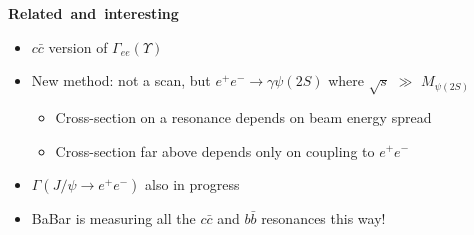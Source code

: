 \documentclass[landscape]{article}
\newenvironment{slide}[1][ ]{\mbox{\bf \boldmath #1 } \vfill}{\vfill \vspace{-1.5 cm} \mbox{ } \pagebreak}
\newenvironment{itemizer}[1]{\begin{itemize}\setlength{\itemsep}{#1}}{\end{itemize}}
\begin{document}
\begin{slide}[Related and interesting]

\vfill
\begin{center}
\end{center}

\vfill
\begin{itemizer}{1 cm}

  \item $c\bar{c}$ version of $\Gamma_{ee}(\Upsilon)$

  \item New method: not a scan, but $e^+e^- \to \gamma \psi(2S)$ where $\sqrt{s}$ $\gg$ $M_{\psi(2S)}$

    \begin{itemizer}{0.75 cm}

      \item Cross-section on a resonance depends on beam energy spread


      \item Cross-section far above depends only on coupling to $e^+e^-$

    \end{itemizer}

  \item $\Gamma(J/\psi \to e^+e^-)$ also in progress

  \item BaBar is measuring all the $c\bar{c}$ and $b\bar{b}$ resonances this way!

\end{itemizer}

\vfill

\end{slide}
\end{document}
